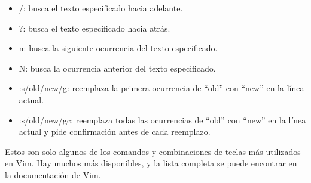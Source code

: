 \documentclass[
  a4paper,
]{article}
\providecommand{\tightlist}{%
  \setlength{\itemsep}{0pt}\setlength{\parskip}{0pt}}\usepackage{longtable,booktabs,array}
\begin{document}
\begin{enumerate}
  \begin{itemize}
  \tightlist
  \item
    /: busca el texto especificado hacia adelante.
  \item
    ?: busca el texto especificado hacia atrás.
  \item
    n: busca la siguiente ocurrencia del texto especificado.
  \item
    N: busca la ocurrencia anterior del texto especificado.
  \item
    :s/old/new/g: reemplaza la primera ocurrencia de ``old'' con ``new''
    en la línea actual.
  \item
    :s/old/new/gc: reemplaza todas las ocurrencias de ``old'' con
    ``new'' en la línea actual y pide confirmación antes de cada
    reemplazo.
  \end{itemize}
\end{enumerate}

Estos son solo algunos de los comandos y combinaciones de teclas más
utilizados en Vim. Hay muchos más disponibles, y la lista completa se
puede encontrar en la documentación de Vim.


\printbibliography
\end{document}
